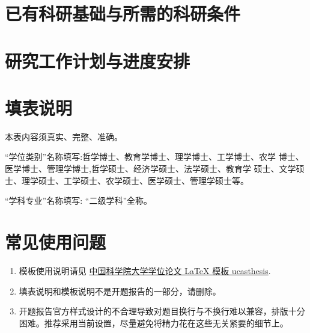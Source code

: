\section{已有科研基础与所需的科研条件}

\section{研究工作计划与进度安排}

\section*{填表说明}

本表内容须真实、完整、准确。

“学位类别”名称填写:哲学博士、教育学博士、理学博士、工学博士、农学 博士、医学博士、管理学博士,哲学硕士、经济学硕士、法学硕士、教育学 硕士、文学硕士、理学硕士、工学硕士、农学硕士、医学硕士、管理学硕士等。

“学科专业”名称填写: “二级学科”全称。

\section*{常见使用问题}

\begin{enumerate}
    \item 模板使用说明请见 \href{https://github.com/mohuangrui/ucasthesis}{中国科学院大学学位论文 LaTeX 模板 ucasthesis}.
    \item 填表说明和模板说明不是开题报告的一部分，请删除。
    \item 开题报告官方样式设计的不合理导致对题目换行与不换行难以兼容，排版十分困难。推荐采用当前设置，尽量避免将精力花在这些无关紧要的细节上。
\end{enumerate}

\nocite{*}%

